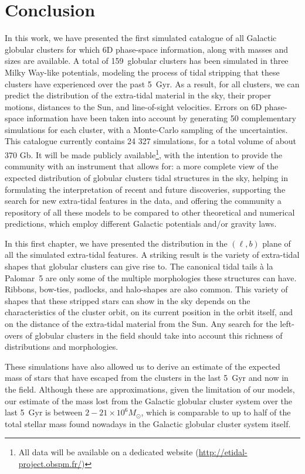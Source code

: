 \section{Conclusion}
    In this work, we have presented the first simulated catalogue of  all Galactic globular clusters for which 6D phase-space information, along with masses and sizes are available. A total of 159~globular clusters has been simulated in three Milky Way-like potentials, modeling  the process of tidal stripping that these clusters have experienced over the past 5~Gyr.  As a result, for all clusters, we can predict the distribution of the extra-tidal material in the sky, their proper motions,  distances to the Sun, and line-of-sight velocities. Errors on 6D phase-space  information have been taken into account by generating 50 complementary simulations for each cluster, with a Monte-Carlo sampling of the uncertainties.  This catalogue currently contains 24 327 simulations, for a total volume of about 370 Gb. It will be made publicly available\footnote{All data will be available on a dedicated website (\url{http://etidal-project.obspm.fr/})}, with the intention to provide the community with an instrument that allows for:  a more complete view of the expected distribution of globular clusters tidal structures in the sky,  helping in formulating the interpretation of recent and future discoveries,  supporting the search for new extra-tidal features in the data, and offering the community a repository of all these models to be compared to other theoretical and numerical predictions, which employ different Galactic potentials and/or gravity laws.

    In this first chapter, we have presented the distribution in the $(\ell, b)$ plane of all the simulated extra-tidal features. A striking result is the variety of extra-tidal shapes that globular clusters can give rise to. The canonical tidal tails \`a la Palomar~5 are only some of the multiple morphologies these structures can have. Ribbons, bow-ties, padlocks, and halo-shapes are also common. This variety of shapes that these stripped stars can show in the sky depends on the characteristics of the cluster orbit, on its current position in the orbit itself, and on the distance of the extra-tidal material from the Sun. Any search for the left-overs of globular clusters in the field should take into account this richness of distributions and morphologies. 

    These simulations have also allowed us to derive an estimate of the expected mass of stars that have escaped from the clusters in the last 5~Gyr and now in the field. Although these are approximations, given the limitation of our models, our estimate of the mass lost from the Galactic globular cluster system over the last 5~Gyr is between $2-21\times 10^6 M_{\odot}$, which is comparable to up to half of the total stellar mass found nowadays in the Galactic globular cluster system itself. 

